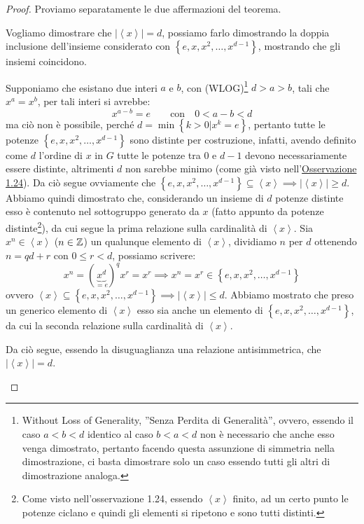 \documentclass[11pt]{scrartcl}
\begin{document}
\begin{proof}
Proviamo separatamente le due affermazioni del teorema.
	\begin{enumerate}[(1)]
		\ii Vogliamo dimostrare che $|\left<x\right>|=d$, possiamo farlo dimostrando la doppia inclusione dell'insieme considerato con $\left\{e, x, x^2, \ldots, x^{d-1}\right\}$, mostrando che gli insiemi coincidono.
		\begin{itemize}
			\ii Supponiamo che esistano due interi $a$ e $b$, con (WLOG)\footnote{Without Loss of Generality, ''Senza Perdita di Generalità'', ovvero, essendo il caso $a<b<d$ identico al caso $b<a<d$ non è necessario che anche esso venga dimostrato, pertanto facendo questa assunzione di simmetria nella dimostrazione, ci basta dimostrare solo un caso essendo tutti gli altri di dimostrazione analoga.} $d>a>b$, tali che $x^a=x^b$, per tali interi si avrebbe:
			\[ x^{a-b}
			=
			e
			\qquad
			\text{con} \quad
			0<a-b<d
			\]
			ma ciò non è possibile, perché $d=\min\left\{k>0 | x^k=e\right\}$, pertanto tutte le potenze $\left\{e, x, x^2, \ldots, x^{d-1}\right\}$ sono distinte per costruzione,
			infatti, avendo definito come $d$ l'ordine di $x$ in $G$ tutte le potenze tra $0$ e $d-1$ devono necessariamente essere distinte, altrimenti $d$ non sarebbe minimo (come già visto nell'\hyperref[rem:g_uno]{Osservazione 1.24}).
			Da ciò segue ovviamente che $\left\{e, x, x^2, \ldots, x^{d-1}\right\} \subseteq \left<x\right> \implies |\left<x\right>| \geq d$. Abbiamo quindi dimostrato che, considerando un insieme di $d$
			potenze distinte esso è contenuto nel sottogruppo generato da $x$ (fatto appunto da potenze distinte\footnote{Come visto nell'osservazione 1.24, essendo $\left<x\right>$ finito, ad un certo punto le potenze ciclano e quindi gli elementi si ripetono e sono tutti distinti.}), da cui segue la prima relazione sulla cardinalità di $\left<x\right>$.
			\ii Sia $x^n \in \left<x\right>$ ($n \in \mathbb Z$) un qualunque elemento di $\left<x\right>$, dividiamo $n$ per $d$ ottenendo $n=qd+r$ con $0 \leq r <d$, possiamo scrivere:
			\[ x^n
			=
			(\underbrace{x^d}_{= e})^qx^r
			=
			x^r
			\implies
			x^n=x^r \in \left\{e, x, x^2, \ldots, x^{d-1}\right\}
			\]
			ovvero $\left<x\right> \subseteq \left\{e, x, x^2, \ldots, x^{d-1}\right\} \implies |\left<x\right>| \leq d$. Abbiamo mostrato che preso un generico elemento di $\left<x\right>$ esso sia anche un elemento di $\left\{e, x, x^2, \ldots, x^{d-1}\right\}$, da cui la seconda relazione sulla cardinalità di $\left<x\right>$.
		\end{itemize}
		Da ciò segue, essendo la disuguaglianza una relazione antisimmetrica, che $|\left<x\right>|=d$.

\end{enumerate}
\end{proof}
\end{document}
